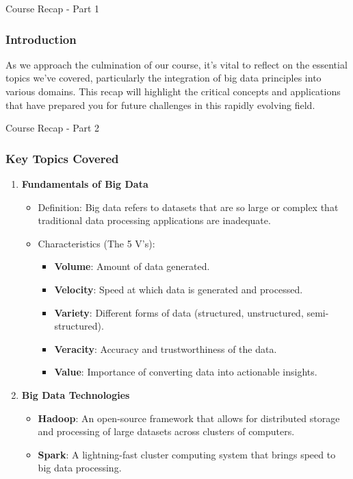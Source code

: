 \documentclass[aspectratio=169]{beamer}
\begin{document}
\begin{frame}[fragile]{Course Recap - Part 1}
    \frametitle{Introduction}
    As we approach the culmination of our course, it's vital to reflect on the essential topics we've covered, particularly the integration of big data principles into various domains. This recap will highlight the critical concepts and applications that have prepared you for future challenges in this rapidly evolving field.
\end{frame}

\begin{frame}[fragile]{Course Recap - Part 2}
    \frametitle{Key Topics Covered}

    \begin{enumerate}
        \item \textbf{Fundamentals of Big Data}
            \begin{itemize}
                \item Definition: Big data refers to datasets that are so large or complex that traditional data processing applications are inadequate.
                \item Characteristics (The 5 V's):
                    \begin{itemize}
                        \item \textbf{Volume}: Amount of data generated.
                        \item \textbf{Velocity}: Speed at which data is generated and processed.
                        \item \textbf{Variety}: Different forms of data (structured, unstructured, semi-structured).
                        \item \textbf{Veracity}: Accuracy and trustworthiness of the data.
                        \item \textbf{Value}: Importance of converting data into actionable insights.
                    \end{itemize}
            \end{itemize}

        \item \textbf{Big Data Technologies}
            \begin{itemize}
                \item \textbf{Hadoop}: An open-source framework that allows for distributed storage and processing of large datasets across clusters of computers.
                \item \textbf{Spark}: A lightning-fast cluster computing system that brings speed to big data processing.
            \end{itemize}
    \end{enumerate}
\end{frame}
\end{document}
